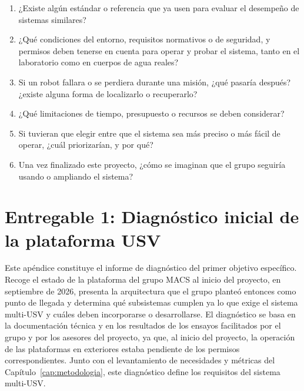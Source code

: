 \begin{enumerate}
    \item ¿Existe algún estándar o referencia que ya usen para evaluar el desempeño de sistemas similares?
    \item ¿Qué condiciones del entorno, requisitos normativos o de seguridad, y permisos deben tenerse en cuenta para operar y probar el sistema, tanto en el laboratorio como en cuerpos de agua reales?
    \item Si un robot fallara o se perdiera durante una misión, ¿qué pasaría después? ¿existe alguna forma de localizarlo o recuperarlo?
    \item ¿Qué limitaciones de tiempo, presupuesto o recursos se deben considerar?
    \item Si tuvieran que elegir entre que el sistema sea más preciso o más fácil de operar, ¿cuál priorizarían, y por qué?
    \item Una vez finalizado este proyecto, ¿cómo se imaginan que el grupo seguiría usando o ampliando el sistema?
\end{enumerate}

\newpage

\chapter{Entregable 1: Diagnóstico inicial de la plataforma USV}
\label{ap:diagnostico}

Este apéndice constituye el informe de diagnóstico del primer objetivo específico. Recoge el estado de la plataforma del grupo MACS al inicio del proyecto, en septiembre de 2026, presenta la arquitectura que el grupo planteó entonces como punto de llegada y determina qué subsistemas cumplen ya lo que exige el sistema multi-USV y cuáles deben incorporarse o desarrollarse. El diagnóstico se basa en la documentación técnica y en los resultados de los ensayos facilitados por el grupo y por los asesores del proyecto, ya que, al inicio del proyecto, la operación de las plataformas en exteriores estaba pendiente de los permisos correspondientes. Junto con el levantamiento de necesidades y métricas del Capítulo~\ref{cap:metodologia}, este diagnóstico define los requisitos del sistema multi-USV. %

